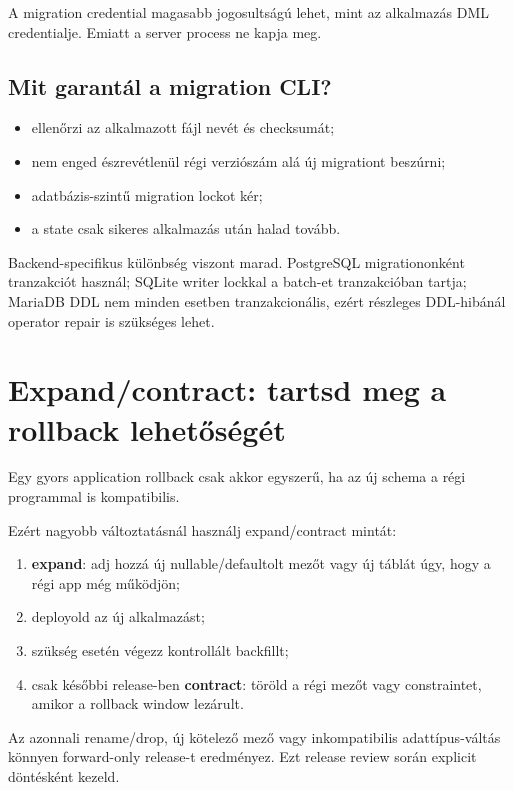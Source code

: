 A migration credential magasabb jogosultságú lehet, mint az alkalmazás DML credentialje. Emiatt a server process ne kapja meg.

\subsection*{Mit garantál a migration CLI?}

\begin{itemize}
\item ellenőrzi az alkalmazott fájl nevét és checksumát;
\item nem enged észrevétlenül régi verziószám alá új migrationt beszúrni;
\item adatbázis-szintű migration lockot kér;
\item a state csak sikeres alkalmazás után halad tovább.
\end{itemize}

Backend-specifikus különbség viszont marad. PostgreSQL migrationonként tranzakciót használ; SQLite  writer lockkal a batch-et tranzakcióban tartja; MariaDB DDL nem minden esetben tranzakcionális, ezért részleges DDL-hibánál operator repair is szükséges lehet.

\section{Expand/contract: tartsd meg a rollback lehetőségét}

Egy gyors application rollback csak akkor egyszerű, ha az új schema a régi programmal is kompatibilis.

Ezért nagyobb változtatásnál használj expand/contract mintát:

\begin{enumerate}
\item \textbf{expand}: adj hozzá új nullable/defaultolt mezőt vagy új táblát úgy, hogy a régi app még működjön;
\item deployold az új alkalmazást;
\item szükség esetén végezz kontrollált backfillt;
\item csak későbbi release-ben \textbf{contract}: töröld a régi mezőt vagy constraintet, amikor a rollback window lezárult.
\end{enumerate}

Az azonnali rename/drop, új kötelező mező vagy inkompatibilis adattípus-váltás könnyen forward-only release-t eredményez. Ezt release review során explicit döntésként kezeld.


